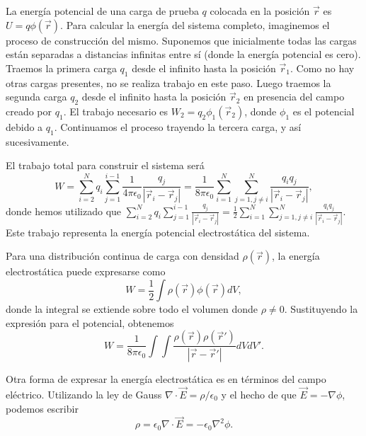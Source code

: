 \documentclass[12pt,a4paper]{book}
\begin{document}
La energía potencial de una carga de prueba $q$ colocada en la posición $\vec{r}$ es $U = q\phi(\vec{r})$. Para calcular la energía del sistema completo, imaginemos el proceso de construcción del mismo. Suponemos que inicialmente todas las cargas están separadas a distancias infinitas entre sí (donde la energía potencial es cero). Traemos la primera carga $q_1$ desde el infinito hasta la posición $\vec{r}_1$. Como no hay otras cargas presentes, no se realiza trabajo en este paso. Luego traemos la segunda carga $q_2$ desde el infinito hasta la posición $\vec{r}_2$ en presencia del campo creado por $q_1$. El trabajo necesario es $W_2 = q_2\phi_1(\vec{r}_2)$, donde $\phi_1$ es el potencial debido a $q_1$. Continuamos el proceso trayendo la tercera carga, y así sucesivamente.

El trabajo total para construir el sistema será
\begin{equation}
W = \sum_{i=2}^{N} q_i \sum_{j=1}^{i-1} \frac{1}{4\pi\epsilon_0} \frac{q_j}{|\vec{r}_i - \vec{r}_j|} = \frac{1}{8\pi\epsilon_0} \sum_{i=1}^{N} \sum_{j=1, j\neq i}^{N} \frac{q_i q_j}{|\vec{r}_i - \vec{r}_j|},
\end{equation}
donde hemos utilizado que $\sum_{i=2}^{N} q_i \sum_{j=1}^{i-1} \frac{q_j}{|\vec{r}_i - \vec{r}_j|} = \frac{1}{2} \sum_{i=1}^{N} \sum_{j=1, j\neq i}^{N} \frac{q_i q_j}{|\vec{r}_i - \vec{r}_j|}$. Este trabajo representa la energía potencial electrostática del sistema.

Para una distribución continua de carga con densidad $\rho(\vec{r})$, la energía electrostática puede expresarse como
\begin{equation}
W = \frac{1}{2} \int \rho(\vec{r}) \phi(\vec{r}) dV,
\end{equation}
donde la integral se extiende sobre todo el volumen donde $\rho \neq 0$. Sustituyendo la expresión para el potencial, obtenemos
\begin{equation}
W = \frac{1}{8\pi\epsilon_0} \int\int \frac{\rho(\vec{r})\rho(\vec{r}')}{|\vec{r} - \vec{r}'|} dV dV'.
\end{equation}

Otra forma de expresar la energía electrostática es en términos del campo eléctrico. Utilizando la ley de Gauss $\nabla \cdot \vec{E} = \rho/\epsilon_0$ y el hecho de que $\vec{E} = -\nabla\phi$, podemos escribir
\begin{equation}
\rho = \epsilon_0 \nabla \cdot \vec{E} = -\epsilon_0 \nabla^2\phi.
\end{equation}
\end{document}
